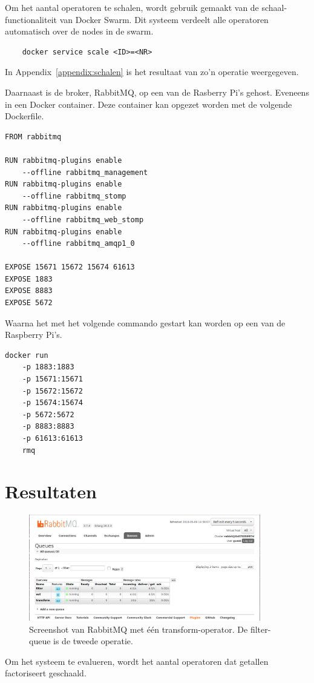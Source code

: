 \documentclass[twocolumn, a4paper]{article}
\begin{document}
Om het aantal operatoren te schalen, wordt gebruik gemaakt van de schaal-functionaliteit van Docker Swarm. Dit systeem verdeelt alle operatoren automatisch over de nodes in de swarm.

\begin{verbatim}
    docker service scale <ID>=<NR>
\end{verbatim}

In Appendix~\ref{appendix:schalen} is het resultaat van zo'n operatie weergegeven. 

Daarnaast is de broker, RabbitMQ, op een van de Rasberry Pi's gehost. Eveneens in een Docker container. Deze container kan opgezet worden met de volgende Dockerfile.

\begin{verbatim}
FROM rabbitmq

RUN rabbitmq-plugins enable 
    --offline rabbitmq_management
RUN rabbitmq-plugins enable 
    --offline rabbitmq_stomp
RUN rabbitmq-plugins enable
    --offline rabbitmq_web_stomp
RUN rabbitmq-plugins enable 
    --offline rabbitmq_amqp1_0

EXPOSE 15671 15672 15674 61613
EXPOSE 1883
EXPOSE 8883
EXPOSE 5672
\end{verbatim}

Waarna het met het volgende commando gestart kan worden op een van de Raspberry Pi's. 
\begin{verbatim}
docker run  
    -p 1883:1883 
    -p 15671:15671 
    -p 15672:15672 
    -p 15674:15674 
    -p 5672:5672 
    -p 8883:8883 
    -p 61613:61613 
    rmq
\end{verbatim}

\section{Resultaten}
\begin{figure}[htb]
    \centering
    \includegraphics[width=0.9\textwidth]{main_1_2}
    \caption{Screenshot van RabbitMQ met één transform-operator. De filter-queue is de tweede operatie.}\label{fig:dashboard}
\end{figure}
Om het systeem te evalueren, wordt het aantal operatoren dat getallen factoriseert geschaald. 
\end{document}
